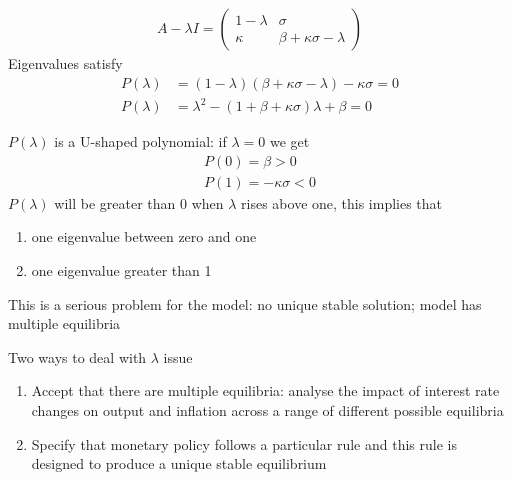 \documentclass{beamer}
\begin{document}
\begin{frame}
  \begin{align}
  A-\lambda I = \begin{pmatrix}
    1-\lambda & \sigma \\
    \kappa    & \beta + \kappa \sigma - \lambda
  \end{pmatrix}
 \end{align}
 Eigenvalues satisfy
\begin{align} 
    P(\lambda) &=(1-\lambda)(\beta+\kappa\sigma-\lambda)-\kappa\sigma=0\\
    P(\lambda) &= \lambda^2  -(1+\beta+\kappa\sigma)\lambda+\beta=0
\end{align} 
\end{frame}

\begin{frame} $P(\lambda)$ is a U-shaped polynomial: if $\lambda=0$ we get 
 \begin{align}
   P(0)=\beta>0\\
   P(1)=-\kappa \sigma <0
 \end{align}
 $P(\lambda)$ will be greater than 0 when $\lambda$ rises above one, this implies that 
 \begin{enumerate}
   \item one eigenvalue between zero and one 
   \item one eigenvalue greater than 1
 \end{enumerate}
This is a serious problem for the model: no unique stable solution; model has multiple equilibria
\end{frame}

\begin{frame}
  Two ways to deal with $\lambda$ issue
\begin{enumerate}
  \item Accept that there are multiple equilibria: analyse the impact of interest rate changes on output and inflation across a range of different possible equilibria
  \item Specify that monetary policy follows a particular rule and this rule is designed to produce a unique stable equilibrium
\end{enumerate}
\end{frame}
\end{document}
